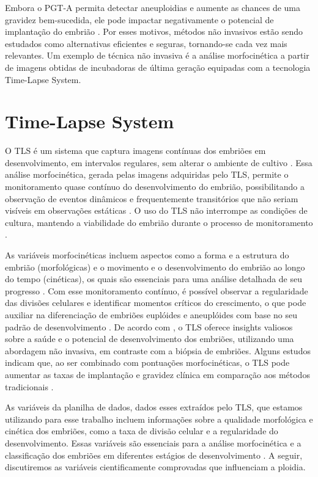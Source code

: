Embora o PGT-A permita detectar aneuploidias e aumente as chances de uma gravidez bem-sucedida, ele pode impactar negativamente o potencial de implantação do embrião \cite{gleicher2021}. Por esses motivos, métodos não invasivos estão sendo estudados como alternativas eficientes e seguras, tornando-se cada vez mais relevantes. Um exemplo de técnica não invasiva é a análise morfocinética a partir de imagens obtidas de incubadoras de última geração equipadas com a tecnologia Time-Lapse System.

\section{Time-Lapse System}

O TLS é um sistema que captura imagens contínuas dos embriões em desenvolvimento, em intervalos regulares, sem alterar o ambiente de cultivo \cite{moustakli2024}. Essa análise morfocinética, gerada pelas imagens adquiridas pelo TLS, permite o monitoramento quase contínuo do desenvolvimento do embrião, possibilitando a observação de eventos dinâmicos e frequentemente transitórios que não seriam visíveis em observações estáticas \cite{boucret2021}. O uso do TLS não interrompe as condições de cultura, mantendo a viabilidade do embrião durante o processo de monitoramento \cite{moustakli2024}.

As variáveis morfocinéticas incluem aspectos como a forma e a estrutura do embrião (morfológicas) e o movimento e o desenvolvimento do embrião ao longo do tempo (cinéticas), os quais são essenciais para uma análise detalhada de seu progresso \cite{gleicher2021}. Com esse monitoramento contínuo, é possível observar a regularidade das divisões celulares e identificar momentos críticos do crescimento, o que pode auxiliar na diferenciação de embriões euplóides e aneuplóides com base no seu padrão de desenvolvimento \cite{boucret2021}. De acordo com , o TLS oferece insights valiosos sobre a saúde e o potencial de desenvolvimento dos embriões, utilizando uma abordagem não invasiva, em contraste com a biópsia de embriões. Alguns estudos indicam que, ao ser combinado com pontuações morfocinéticas, o TLS pode aumentar as taxas de implantação e gravidez clínica em comparação aos métodos tradicionais \cite{boucret2021}.

As variáveis da planilha de dados, dados esses extraídos pelo TLS, que estamos utilizando para esse trabalho incluem informações sobre a qualidade morfológica e cinética dos embriões, como a taxa de divisão celular e a regularidade do desenvolvimento. Essas variáveis são essenciais para a análise morfocinética e a classificação dos embriões em diferentes estágios de desenvolvimento \cite{boucret2021}. A seguir, discutiremos as variáveis cientificamente comprovadas que influenciam a ploidia.

